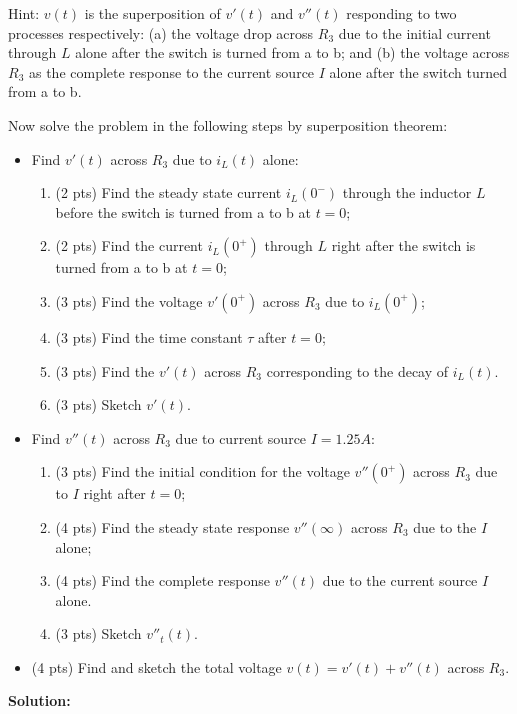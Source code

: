 \documentclass{article}
\begin{document}
\begin{itemize}
Hint: $v(t)$ is the superposition of $v'(t)$ and $v''(t)$ responding to two processes
respectively:
(a) the voltage drop across $R_3$ due to the initial current through $L$ alone after
the switch is turned from a to b; and (b) the voltage across $R_3$ as the complete 
response to the current source $I$ alone after the switch turned from a to b.


Now solve the problem in the following steps by superposition theorem:
\begin{itemize}
  \item Find $v'(t)$ across $R_3$ due to $i_L(t)$ alone:
    \begin{enumerate}
    \item (2 pts) Find the steady state current $i_L(0^-)$ through the inductor $L$ 
      before the switch is turned from a to b at $t=0$;
    \item (2 pts) Find the current $i_L(0^+)$ through $L$ right after the switch is 
      turned from a to b at $t=0$;
    \item (3 pts) Find the voltage $v'(0^+)$ across $R_3$ due to $i_L(0^+)$;
    \item (3 pts) Find the time constant $\tau$ after $t=0$;
    \item (3 pts) Find the $v'(t)$ across $R_3$ corresponding to the decay of
      $i_L(t)$.
    \item (3 pts) Sketch $v'(t)$.
    \end{enumerate}
  \item Find $v''(t)$ across $R_3$ due to current source $I=1.25 A$:
    \begin{enumerate}
    \item (3 pts) Find the initial condition for the voltage $v''(0^+)$ across 
      $R_3$ due to $I$ right after $t=0$;
    \item (4 pts) Find the steady state response $v''(\infty)$ across $R_3$ due 
      to the $I$ alone;
    \item (4 pts) Find the complete response $v''(t)$ due to the current source
      $I$ alone.
    \item (3 pts) Sketch $v''_t(t)$.
    \end{enumerate}
  \item (4 pts) Find and sketch the total voltage $v(t)=v'(t)+v''(t)$ across $R_3$.
\end{itemize}

{\bf Solution:}


\end{itemize}
\end{document}
